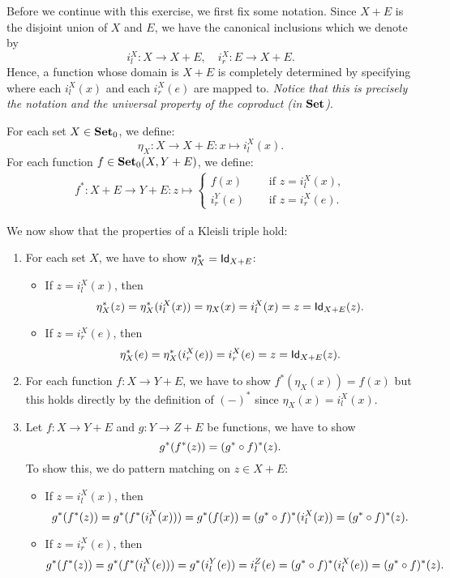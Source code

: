 \begin{solution}
\label{sol:kleisli_triple_exception}
Before we continue with this exercise, we first fix some notation. Since $X+E$ is the disjoint union of $X$ and $E$, we have the canonical inclusions which we denote by
\[ i^X_l : X\to X + E, \quad i^X_r : E\to X+E. \] 
Hence, a function whose domain is $X+E$ is completely determined by specifying where each $i^X_l(x)$ and each $i^X_r(e)$ are mapped to. \textit{Notice that this is precisely the notation and the universal property of the coproduct (in $\SET$)}.

For each set $X\in\Ob \SET$, we define:
\[
\eta_X : X \to X+E : x\mapsto i^X_l(x).
\]
For each function $f\in\CHom{\Ob \SET}{X}{Y+E}$, we define:
\begin{align*}
f^{*} :X+E \to Y+E : z \mapsto 
\begin{cases}
f(x) &\quad \text{ if } z=i^X_l(x),\\
i^Y_r(e) &\quad \text{ if } z=i^X_r(e).
\end{cases}
\end{align*}


We now show that the properties of a Kleisli triple hold:
\begin{enumerate}
\item For each set $X$, we have to show $\eta_X^{*} = \Id[X+E]$: 
\begin{itemize}
\item If $z=i^X_l(x)$, then 
\[
\eta_X^{*}(z) = \eta_X^{*}(i^X_l(x)) = \eta_X(x) = i^X_l(x) = z = \Id[X+E](z).
\]
\item If $z=i^X_r(e)$, then
\[
\eta_X^{*}(e) = \eta_X^{*}(i^X_r(e)) = i^X_r(e) = z = \Id[X+E](z).
\]
\end{itemize}

\item For each function $f:X\to Y + E$, we have to show $f^{*}(\eta_X(x)) = f(x)$ but this holds directly by the definition of $(-)^{*}$ since $\eta_X(x)=i_l^X(x)$.

\item Let $f:X\to Y + E$ and $g:Y\to Z + E$ be functions, we have to show 
\[
g^{*}(f^{*}(z)) = (\co{f}{g^{*}})^{*}(z).
\] 
To show this, we do pattern matching on $z\in X+E$:
\begin{itemize}
\item If $z=i^X_l(x)$, then
\[
g^{*}(f^{*}(z)) = g^{*}(f^{*}(i_l^X(x))) = g^{*}(f(x)) = (\co{f}{g^{*}})^{*}(i_l^X(x)) = (\co{f}{g^{*}})^{*}(z).
\]
\item If $z=i^X_r(e)$, then
\[
g^{*}(f^{*}(z)) = g^{*}(f^{*}(i_l^X(e))) = g^{*}(i_l^Y(e)) = i_l^Z(e) = (\co{f}{g^{*}})^{*}(i_l^X(e)) = (\co{f}{g^{*}})^{*}(z).
\]
\end{itemize}

\end{enumerate}
\end{solution}

